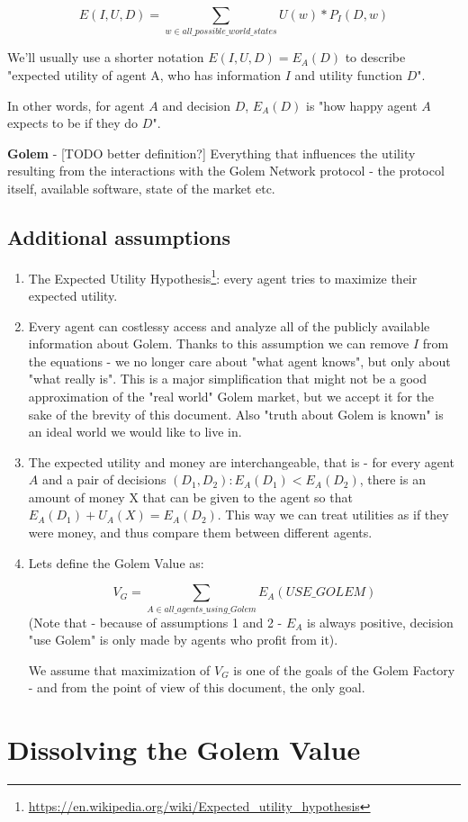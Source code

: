 \documentclass{article}
\begin{document}
$$
E(I, U, D) = \sum_{w \in all\_possible\_world\_states}U(w) * P_I(D, w)
$$

We'll usually use a shorter notation $E(I, U, D) = E_A(D)$ to describe "expected utility of agent A, who has information $I$ and utility function $D$".

In other words, for agent $A$ and decision $D$, $E_A(D)$ is "how happy agent $A$ expects to be if they do $D$".
\newline

\textbf{Golem} - [TODO better definition?] Everything that influences the utility resulting from the interactions with the Golem Network protocol - the protocol itself, available software, state of the market etc.
\newline

\subsection{Additional assumptions}

\begin{enumerate}
\item The Expected Utility Hypothesis\footnote{\href{https://en.wikipedia.org/wiki/Expected\_utility\_hypothesis}{https://en.wikipedia.org/wiki/Expected\_utility\_hypothesis}}: every agent tries to maximize their expected utility.

\item Every agent can costlessy access and analyze all of the publicly available information about Golem. Thanks to this assumption we can remove $I$ from the equations - we no longer
    care about "what agent knows", but only about "what really is". This is a major simplification that might not be a good approximation of the "real world" Golem market, but we
    accept it for the sake of the brevity of this document. Also "truth about Golem is known" is an ideal world we would like to live in.

\item The expected utility and money are interchangeable, that is - for every agent $A$ and a pair of decisions $(D_1, D_2): E_A(D_1) < E_A(D_2)$, there is an amount of money X that
    can be given to the agent so that $E_A(D_1) + U_A(X) = E_A(D_2)$. This way we can treat utilities as if they were money, and thus compare them between different agents.

\item Lets define the Golem Value as:

$$
        V_G = \sum_{A \in all\_agents\_using\_Golem}E_A(USE\_GOLEM)
$$
(Note that - because of assumptions 1 and 2 - $E_A$ is always positive, decision "use Golem" is only made by agents who profit from it).

We assume that maximization of $V_G$ is one of the goals of the Golem Factory - and from the point of view of this document, the only goal.
\end{enumerate}

\section{Dissolving the Golem Value}
\end{document}
